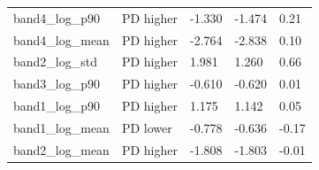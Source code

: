 \documentclass[11pt,a4paper]{article}
\begin{document}
\begin{center}
\begin{longtable}{>{\raggedright\arraybackslash}p{4.20cm}>{\raggedright\arraybackslash}p{2.55cm}>{\raggedleft\arraybackslash}p{2.55cm}>{\raggedleft\arraybackslash}p{2.55cm}>{\raggedleft\arraybackslash}p{2.55cm}}
\hspace{0pt}band4\_\allowbreak{}log\_\allowbreak{}p90 & \hspace{0pt}PD higher & \hspace{0pt}-1.330 & \hspace{0pt}-1.474 & \hspace{0pt}0.21\\
\hspace{0pt}band4\_\allowbreak{}log\_\allowbreak{}mean & \hspace{0pt}PD higher & \hspace{0pt}-2.764 & \hspace{0pt}-2.838 & \hspace{0pt}0.10\\
\hspace{0pt}band2\_\allowbreak{}log\_\allowbreak{}std & \hspace{0pt}PD higher & \hspace{0pt}1.981 & \hspace{0pt}1.260 & \hspace{0pt}0.66\\
\hspace{0pt}band3\_\allowbreak{}log\_\allowbreak{}p90 & \hspace{0pt}PD higher & \hspace{0pt}-0.610 & \hspace{0pt}-0.620 & \hspace{0pt}0.01\\
\hspace{0pt}band1\_\allowbreak{}log\_\allowbreak{}p90 & \hspace{0pt}PD higher & \hspace{0pt}1.175 & \hspace{0pt}1.142 & \hspace{0pt}0.05\\
\hspace{0pt}band1\_\allowbreak{}log\_\allowbreak{}mean & \hspace{0pt}PD lower & \hspace{0pt}-0.778 & \hspace{0pt}-0.636 & \hspace{0pt}-0.17\\
\hspace{0pt}band2\_\allowbreak{}log\_\allowbreak{}mean & \hspace{0pt}PD higher & \hspace{0pt}-1.808 & \hspace{0pt}-1.803 & \hspace{0pt}-0.01\\

\end{longtable}
\end{center}
\end{document}
